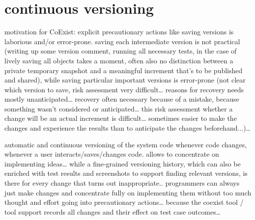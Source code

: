 \section{continuous versioning}

motivation for CoExist: explicit precautionary actions like saving versions is laborious and/or error-prone. saving each intermediate version is not practical (writing up some version comment, running all necessary tests, in the case of lively saving all objects takes a moment, often also no distinction between a private temporary snapshot and a meaningful increment that’s to be published and shared), while saving particular important versions is error-prone (not clear which version to save, risk assessment very difficult… reasons for recovery needs mostly unanticipated… recovery often necessary because of a mistake, because something wasn’t considered or anticipated… this risk assessment whether a change will be an actual increment is difficult… sometimes easier to make the changes and experience the results than to anticipate the changes beforehand...)… 


automatic and continuous versioning of the system code whenever code changes, whenever a user interacts/saves/changes code.
allows to concentrate on implementing ideas… while a fine-grained versioning history, which can also be enriched with test results and screenshots to support finding relevant versions, is there for every change that turns out inappropriate.. programmers can always just make changes and concentrate fully on implementing them without too much thought and effort going into precautionary actions… because the coexist tool / tool support records all changes and their effect on test case outcomes… 



% 
% 
% 
% 
